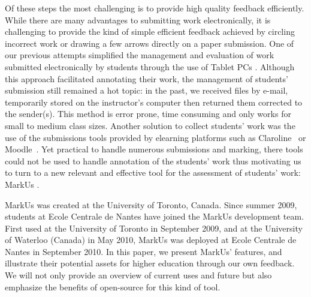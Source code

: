 \documentclass[twocolumn,10pt]{asme2e}
\begin{document}
Of these steps the most challenging is to provide high quality feedback efficiently. While there are many advantages to submitting work electronically, it is challenging to provide the kind of simple efficient feedback achieved by circling incorrect work or drawing a few arrows directly on a paper submission. One of our previous attempts simplified the management and evaluation of work submitted electronically by students through the use of Tablet PCs \cite{magnin-tice-2010}. Although this approach facilitated annotating their work, the management of students' submission still remained a hot topic: in the past, we received files by e-mail, temporarily stored on the instructor's computer then returned them corrected to the sender(s). This method is error prone, time consuming and only works for small to medium class sizes. Another solution to collect students' work was the use of the submissions tools provided by elearning platforms such as Claroline~\cite{claroline} or Moodle~\cite{moodle}. Yet practical to handle numerous submissions and marking, there tools could not be used to handle  annotation of the students' work thus motivating us to turn to a new relevant and effective tool for the assessment of students' work: MarkUs \cite{markus}.

MarkUs was created at the University of Toronto, Canada. Since summer 2009, students at Ecole Centrale de Nantes have joined the MarkUs development team. First used at the University of Toronto in September 2009, and at the University of Waterloo (Canada) in May 2010, MarkUs was deployed at Ecole Centrale de Nantes in September 2010. In this paper, we present MarkUs' features, and illustrate their potential assets for higher education through our own feedback. We will not only provide an overview of current uses and future but also emphasize the benefits of open-source for this kind of tool.
\end{document}
